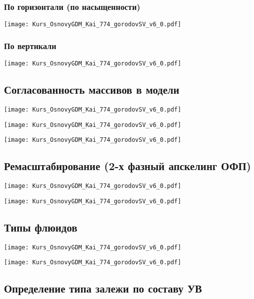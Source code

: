\documentclass[main.tex]{subfiles}
\begin{document}
\subsubsection{По горизонтали (по насыщенности)}

\texttt{[image: Kurs\_OsnovyGDM\_Kai\_774\_gorodovSV\_v6\_0.pdf]}

\subsubsection{По вертикали}

\texttt{[image: Kurs\_OsnovyGDM\_Kai\_774\_gorodovSV\_v6\_0.pdf]}

\subsection{Согласованность массивов в модели}

\texttt{[image: Kurs\_OsnovyGDM\_Kai\_774\_gorodovSV\_v6\_0.pdf]}

\texttt{[image: Kurs\_OsnovyGDM\_Kai\_774\_gorodovSV\_v6\_0.pdf]}

\texttt{[image: Kurs\_OsnovyGDM\_Kai\_774\_gorodovSV\_v6\_0.pdf]}

\subsection{Ремасштабирование (2-х фазный апскелинг ОФП)}

\texttt{[image: Kurs\_OsnovyGDM\_Kai\_774\_gorodovSV\_v6\_0.pdf]}

\texttt{[image: Kurs\_OsnovyGDM\_Kai\_774\_gorodovSV\_v6\_0.pdf]}

\subsection{Типы флюидов}

\texttt{[image: Kurs\_OsnovyGDM\_Kai\_774\_gorodovSV\_v6\_0.pdf]}

\texttt{[image: Kurs\_OsnovyGDM\_Kai\_774\_gorodovSV\_v6\_0.pdf]}

\subsection{Определение типа залежи по составу УВ}
\end{document}
